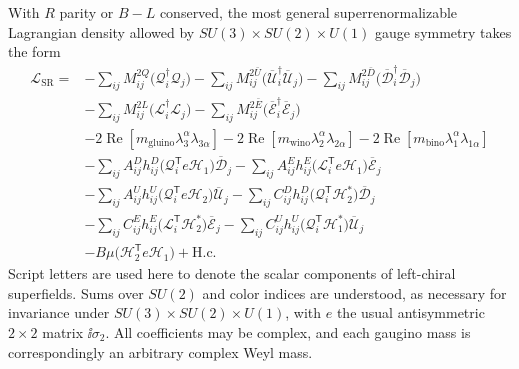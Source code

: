 With \(R\) parity or \(B-L\) conserved, the most general
superrenormalizable Lagrangian density allowed by
\(SU(3)\times SU(2)\times U(1)\) gauge symmetry takes
the form
\begin{equation}
  \begin{aligned}
  \mathcal{L}_{\mathrm{SR}}={}&
  -\sum_{ij}M_{ij}^{2Q}
    \bigl(\mathcal{Q}_i^\dagger\mathcal{Q}_j\bigr)
  -\sum_{ij}M_{ij}^{2\bar U}
    \bigl(\overline{\mathcal{U}}_i^\dagger
          \overline{\mathcal{U}}_j\bigr)
  -\sum_{ij}M_{ij}^{2\bar D}
    \bigl(\overline{\mathcal{D}}_i^\dagger
          \overline{\mathcal{D}}_j\bigr)
  \\
  &-\sum_{ij}M_{ij}^{2L}
    \bigl(\mathcal{L}_i^\dagger\mathcal{L}_j\bigr)
  -\sum_{ij}M_{ij}^{2\bar E}
    \bigl(\overline{\mathcal{E}}_i^\dagger
          \overline{\mathcal{E}}_j\bigr)
  \\
  &-2\operatorname{Re}\!\left[
    m_{\mathrm{gluino}}\lambda_3^\alpha\lambda_{3\alpha}\right]
  -2\operatorname{Re}\!\left[
    m_{\mathrm{wino}}\lambda_2^\alpha\lambda_{2\alpha}\right]
  -2\operatorname{Re}\!\left[
    m_{\mathrm{bino}}\lambda_1^\alpha\lambda_{1\alpha}\right]
  \\
  &-\sum_{ij}A_{ij}^{D}h_{ij}^{D}
    \bigl(\mathcal{Q}_i^{\mathsf T}e\mathcal{H}_1\bigr)
    \overline{\mathcal{D}}_j
  -\sum_{ij}A_{ij}^{E}h_{ij}^{E}
    \bigl(\mathcal{L}_i^{\mathsf T}e\mathcal{H}_1\bigr)
    \overline{\mathcal{E}}_j
  \\
  &-\sum_{ij}A_{ij}^{U}h_{ij}^{U}
    \bigl(\mathcal{Q}_i^{\mathsf T}e\mathcal{H}_2\bigr)
    \overline{\mathcal{U}}_j
  -\sum_{ij}C_{ij}^{D}h_{ij}^{D}
    \bigl(\mathcal{Q}_i^{\mathsf T}\mathcal{H}_2^*\bigr)
    \overline{\mathcal{D}}_j
  \\
  &-\sum_{ij}C_{ij}^{E}h_{ij}^{E}
    \bigl(\mathcal{L}_i^{\mathsf T}\mathcal{H}_2^*\bigr)
    \overline{\mathcal{E}}_j
  -\sum_{ij}C_{ij}^{U}h_{ij}^{U}
    \bigl(\mathcal{Q}_i^{\mathsf T}\mathcal{H}_1^*\bigr)
    \overline{\mathcal{U}}_j
  \\
  &-B\mu\bigl(\mathcal{H}_2^{\mathsf T}e\mathcal{H}_1\bigr)
  +\mathrm{H.c.}
  \end{aligned}
  \tag{28.4.1}\label{eq:28.4.1}
\end{equation}
Script letters are used here to denote the scalar components of
left-chiral superfields. Sums over \(SU(2)\) and color indices are
understood, as necessary for invariance under
\(SU(3)\times SU(2)\times U(1)\), with \(e\) the usual
antisymmetric \(2\times2\) matrix \(\ii\sigma_2\). All coefficients
may be complex, and each gaugino mass is correspondingly an arbitrary
complex Weyl mass.

